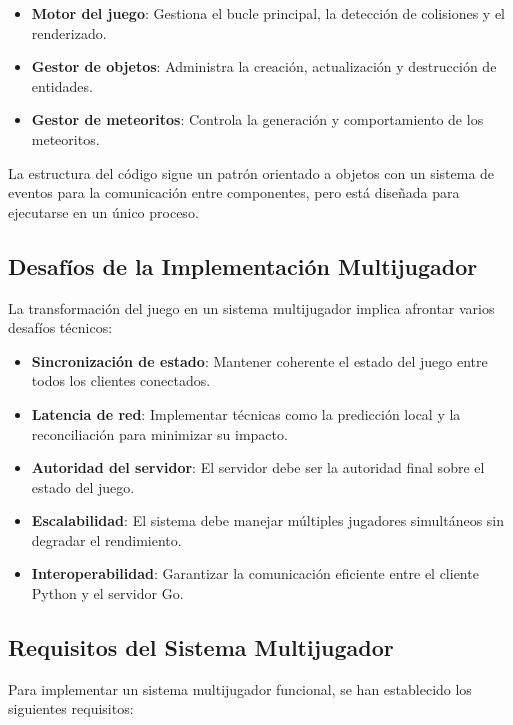 \documentclass[11pt,letterpaper]{article}
\begin{document}
\begin{itemize}
    \item \textbf{Motor del juego}: Gestiona el bucle principal, la detección de colisiones y el renderizado.
    \item \textbf{Gestor de objetos}: Administra la creación, actualización y destrucción de entidades.
    \item \textbf{Gestor de meteoritos}: Controla la generación y comportamiento de los meteoritos.
\end{itemize}

La estructura del código sigue un patrón orientado a objetos con un sistema de eventos para la comunicación entre componentes, pero está diseñada para ejecutarse en un único proceso.

\subsection{Desafíos de la Implementación Multijugador}

La transformación del juego en un sistema multijugador implica afrontar varios desafíos técnicos:

\begin{itemize}
    \item \textbf{Sincronización de estado}: Mantener coherente el estado del juego entre todos los clientes conectados.
    
    \item \textbf{Latencia de red}: Implementar técnicas como la predicción local y la reconciliación para minimizar su impacto.
    
    \item \textbf{Autoridad del servidor}: El servidor debe ser la autoridad final sobre el estado del juego.
    
    \item \textbf{Escalabilidad}: El sistema debe manejar múltiples jugadores simultáneos sin degradar el rendimiento.
    
    \item \textbf{Interoperabilidad}: Garantizar la comunicación eficiente entre el cliente Python y el servidor Go.
\end{itemize}

\subsection{Requisitos del Sistema Multijugador}

Para implementar un sistema multijugador funcional, se han establecido los siguientes requisitos:
\end{document}
